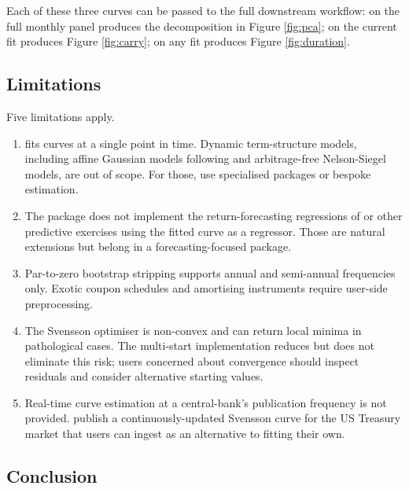 Each of these three curves can be passed to the full downstream
workflow:  on the full monthly panel produces the
decomposition in Figure \ref{fig:pca};  on the current
fit produces Figure \ref{fig:carry};  on any fit
produces Figure \ref{fig:duration}.

\subsection{Limitations}\label{limitations}

Five limitations apply.

\begin{enumerate}
\def\labelenumi{\arabic{enumi}.}
\tightlist
\item
   fits curves at a single point in time. Dynamic
  term-structure models, including affine Gaussian models following
  \citet{ang2003no} and arbitrage-free Nelson-Siegel models, are out of
  scope. For those, use specialised packages or bespoke estimation.
\item
  The package does not implement the return-forecasting regressions of
  \citet{cochrane2005bond} or other predictive exercises using the
  fitted curve as a regressor. Those are natural extensions but belong
  in a forecasting-focused package.
\item
  Par-to-zero bootstrap stripping supports annual and semi-annual
  frequencies only. Exotic coupon schedules and amortising instruments
  require user-side preprocessing.
\item
  The Svensson optimiser is non-convex and can return local minima in
  pathological cases. The multi-start implementation reduces but does
  not eliminate this risk; users concerned about convergence should
  inspect residuals and consider alternative starting values.
\item
  Real-time curve estimation at a central-bank's publication frequency
  is not provided. \citet{gurkaynak2007us} publish a
  continuously-updated Svensson curve for the US Treasury market that
  users can ingest as an alternative to fitting their own.
\end{enumerate}

\FloatBarrier

\subsection{Conclusion}\label{conclusion}

